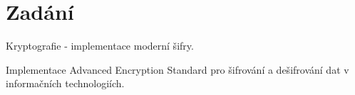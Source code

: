 \setlength{\parskip}{1em}

\chapter*{Zadání}


Kryptografie - implementace moderní šifry.

Implementace Advanced Encryption Standard pro šifrování a dešifrování dat v informačních technologiích.